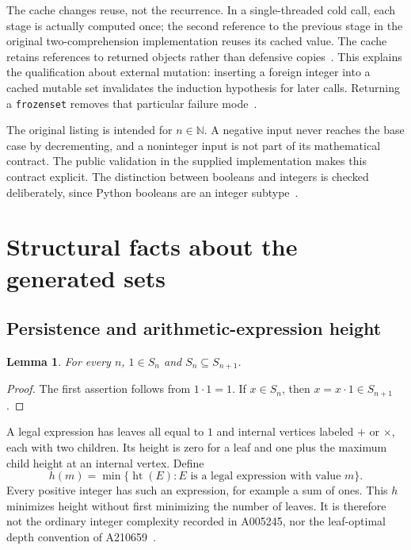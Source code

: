 \documentclass[11pt,a4paper]{article}
\newtheorem{lemma}[theorem]{Lemma}
\theoremstyle{definition}
\theoremstyle{remark}
\newcommand{\NN}{\mathbb{N}}
\DeclareMathOperator{\height}{ht}
\begin{document}
The cache changes reuse, not the recurrence. In a single-threaded cold
call, each stage is actually computed once; the second reference to the
previous stage in the original two-comprehension implementation reuses its
cached value. The cache retains references to returned objects rather
than defensive copies~\cite{functools}. This explains the qualification
about external mutation: inserting a foreign integer into a cached mutable
set invalidates the induction hypothesis for later calls. Returning a
\texttt{frozenset} removes that particular failure mode~\cite{types}.

The original listing is intended for $n\in\NN$. A negative input never
reaches the base case by decrementing, and a noninteger input is not part
of its mathematical contract. The public validation in the supplied
implementation makes this contract explicit. The distinction between
booleans and integers is checked deliberately, since Python booleans are
an integer subtype~\cite{types}.

\section{Structural facts about the generated sets}\label{sec:structure}
\subsection{Persistence and arithmetic-expression height}
\begin{lemma}\label{lem:nested}
For every $n$, $1\in S_n$ and $S_n\subseteq S_{n+1}$.
\end{lemma}
\begin{proof}
The first assertion follows from $1\cdot1=1$.
If $x\in S_n$, then $x=x\cdot1\in S_{n+1}$.
\end{proof}

A legal expression has leaves all equal to $1$ and internal vertices labeled
$+$ or $\times$, each with two children. Its height is zero for a leaf
and one plus the maximum child height at an internal vertex. Define
\[
 h(m)=\min\{\height(E):E\text{ is a legal expression with value }m\}.
\]
Every positive integer has such an expression, for example a sum of ones.
This $h$ minimizes height without first minimizing the number of leaves.
It is therefore not the ordinary integer complexity recorded in
A005245, nor the leaf-optimal depth convention of A210659~\cite{complexity,depth}.
\end{document}
